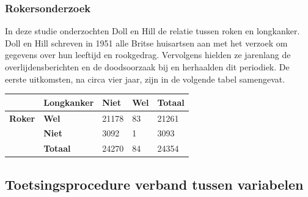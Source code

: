 \begin{frame}
	\frametitle{Rokersonderzoek}
	In deze studie onderzochten Doll en Hill de relatie tussen roken en longkanker. Doll en Hill schreven in 1951 alle Britse huisartsen aan met het verzoek om gegevens over hun leeftijd en rookgedrag. Vervolgens hielden ze jarenlang de overlijdensberichten en de doodsoorzaak bij en herhaalden dit periodiek. De eerste uitkomsten, na circa vier jaar, zijn in de volgende tabel samengevat.
	
	\begin{table}[h]
		\begin{tabular}{@{}lllll@{}}
			\toprule
			& \textbf{Longkanker} & \textbf{Niet} & \textbf{Wel} & \textbf{Totaal} \\ \midrule
			\textbf{Roker} & \textbf{Wel}        & 21178         & 83           & 21261           \\
			& \textbf{Niet}       & 3092          & 1            & 3093            \\
			& \textbf{Totaal}     & 24270         & 84           & 24354           \\ \bottomrule
		\end{tabular}
	\end{table}
\end{frame}

\subsection{Toetsingsprocedure verband tussen variabelen}

